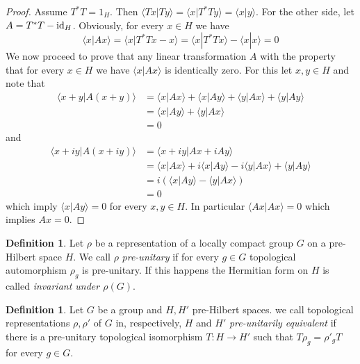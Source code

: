 \documentclass[12pt]{article}
\theoremstyle{definition}
\newtheorem{dfn}[theorem]{Definition}
\theoremstyle{remark}
\begin{document}
    \begin{proof}
        Assume $T^*T=1_H$. Then $\langle Tx|Ty \rangle = \langle x |T^*Ty \rangle = \langle x|y \rangle$. For the other side, let $A=T^*T-\textup{id}_H$. Obviously, for every $x\in H$ we have
        $$
        \langle x | Ax \rangle = \langle x | T^*Tx - x \rangle = \langle x | T^*Tx \rangle - \langle x | x \rangle = 0
        $$
        We now proceed to prove that any linear transformation $A$ with the property that for every $x\in H$ we have $\langle x | Ax \rangle$ is identically zero. For this let $x,y\in H$ and note that
        \begin{align*}
            \langle x+y | A(x+y) \rangle &= \langle x | Ax \rangle + \langle x | Ay \rangle + \langle y | Ax \rangle + \langle y | Ay \rangle \\
            &= \langle x | Ay \rangle + \langle y | Ax \rangle \\
            &= 0
        \end{align*}
        and
        \begin{align*}
            \langle x + iy | A(x + iy) \rangle &= \langle x + iy | Ax + iAy \rangle \\
            &= \langle x | Ax \rangle + i \langle x | Ay \rangle - i \langle y | Ax \rangle + \langle y | Ay \rangle \\
            &= i (\langle x | Ay \rangle - \langle y | Ax \rangle) \\
            &= 0
        \end{align*}
        which imply $\langle x|Ay \rangle = 0$ for every $x,y\in H$. In particular $\langle Ax|Ax \rangle = 0$ which implies $Ax = 0$.
        
    \end{proof}

    \begin{dfn}
        Let $\rho$ be a representation of a locally compact group $G$ on a pre-Hilbert space $H$. We call $\rho$ \emph{pre-unitary} if for every $g\in G$ topological automorphism $\rho_g$ is pre-unitary. If this happens the Hermitian form on $H$ is called \emph{invariant under $\rho(G)$}.
    \end{dfn}

    \begin{dfn}
        Let $G$ be a group and $H,H'$ pre-Hilbert spaces. we call topological representations $\rho,\rho'$ of $G$ in, respectively, $H$ and $H'$ \emph{pre-unitarily equivalent} if there is a pre-unitary topological isomorphism $T\colon H\to H'$ such that $T\rho_g=\rho'_gT$ for every $g\in G$.
    \end{dfn}

    \printbibliography
\end{document}
